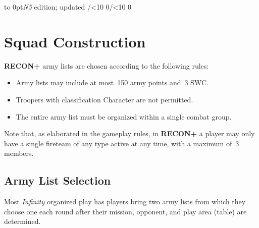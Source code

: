\documentclass[14pt,dvipsnames]{extarticle}
\def\twodigits#1{\ifnum#1<10 0\fi\the#1}
\newcommand{\reconplus}{\textbf{RECON+}\xspace}
\begin{document}
\tableofcontents

\vspace{-16pt}
\hbox to 0pt{}\hfill{\small \emph{N5} edition; updated \the\year/\twodigits\month/\twodigits\day}

\clearpage
{}

\section{Squad Construction}

\reconplus army lists are chosen according to the following rules:

\vspace{-0.5em}
\begin{itemize}
\item Army lists may include at most~150 army points and~3 SWC.

\item Troopers with classification Character are not permitted.

\item The entire army list must be organized within a single combat
  group.



\end{itemize}

\begin{recon}
Note that, as elaborated in the gameplay rules, in \reconplus a player
may only have a single fireteam of any type active at any time, with a
maximum of~3 members.
\end{recon}

\subsection{Army List Selection}

Most \emph{Infinity} organized play has players bring two army lists
from which they choose one each round after their mission, opponent,
and play area (table) are determined.
\end{document}
